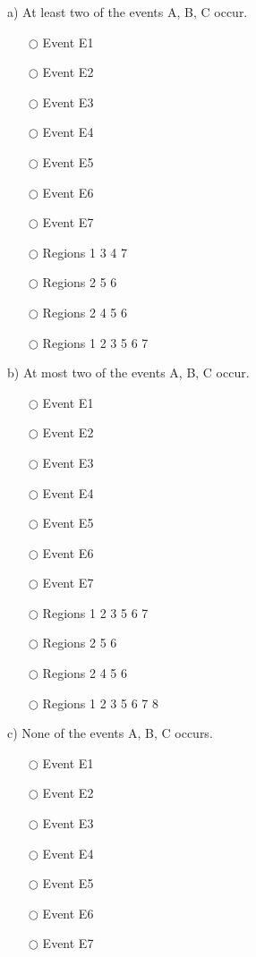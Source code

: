 \documentclass[pdftex, brazil, 12pt, twoside]{article}
\begin{document}
\begin{exercise}
  a) At least two of the events A, B, C occur.
  \begin{itemize}[noitemsep]
  \item[$\bigcirc$] Event E1
  \item[$\bigcirc$] Event E2
  \item[$\bigcirc$] Event E3
  \item[$\bigcirc$] Event E4
  \item[$\bigcirc$] Event E5
  \item[$\bigcirc$] Event E6
  \item[$\bigcirc$] Event E7
  \end{itemize}

  \begin{itemize}[noitemsep]
  \item[$\bigcirc$] Regions 1 3 4 7
  \item[$\bigcirc$] Regions 2 5 6
  \item[$\bigcirc$] Regions 2 4 5 6
  \item[$\bigcirc$] Regions 1 2 3 5 6 7
  \end{itemize}

  b) At most two of the events A, B, C occur.
  \begin{itemize}[noitemsep]
  \item[$\bigcirc$] Event E1
  \item[$\bigcirc$] Event E2
  \item[$\bigcirc$] Event E3
  \item[$\bigcirc$] Event E4
  \item[$\bigcirc$] Event E5
  \item[$\bigcirc$] Event E6
  \item[$\bigcirc$] Event E7
  \end{itemize}

  \begin{itemize}[noitemsep]
  \item[$\bigcirc$] Regions 1 2 3 5 6 7
  \item[$\bigcirc$] Regions 2 5 6
  \item[$\bigcirc$] Regions 2 4 5 6
  \item[$\bigcirc$] Regions 1 2 3 5 6 7 8
  \end{itemize}

  c) None of the events A, B, C occurs.
  \begin{itemize}[noitemsep]
  \item[$\bigcirc$] Event E1
  \item[$\bigcirc$] Event E2
  \item[$\bigcirc$] Event E3
  \item[$\bigcirc$] Event E4
  \item[$\bigcirc$] Event E5
  \item[$\bigcirc$] Event E6
  \item[$\bigcirc$] Event E7
  \end{itemize}


\end{exercise}
\end{document}
